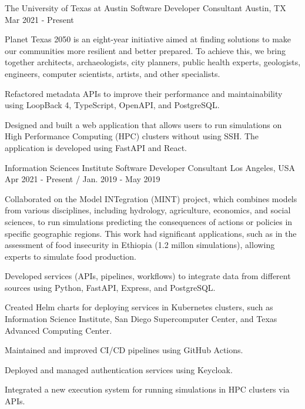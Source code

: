 \begin{cventries}

  \cventry
    {The University of Texas at Austin}
    {Software Developer Consultant}
    {Austin, TX}
    {Mar 2021 - Present}
    {
      \begin{cvitems}
        \item{Planet Texas 2050 is an eight-year initiative aimed at finding solutions to make our communities more resilient and better prepared. To achieve this, we bring together architects, archaeologists, city planners, public health experts, geologists, engineers, computer scientists, artists, and other specialists.}
        \item{Refactored metadata APIs to improve their performance and maintainability using LoopBack 4, TypeScript, OpenAPI, and PostgreSQL.}
        \item{Designed and built a web application that allows users to run simulations on High Performance Computing (HPC) clusters without using SSH. The application is developed using FastAPI and React.}
      \end{cvitems}
    }

  \cventry
    {Information Sciences Institute}
    {Software Developer Consultant}
    {Los Angeles, USA}
    {Apr 2021 - Present / Jan. 2019 - May 2019}
    {
      \begin{cvitems}
        \item{Collaborated on the Model INTegration (MINT) project, which combines models from various disciplines, including hydrology, agriculture, economics, and social sciences, to run simulations predicting the consequences of actions or policies in specific geographic regions. This work had significant applications, such as in the assessment of food insecurity in Ethiopia (1.2 millon simulations), allowing experts to simulate food production.}
        \item{Developed services (APIs, pipelines, workflows) to integrate data from different sources using Python, FastAPI, Express, and PostgreSQL.}
        \item{Created Helm charts for deploying services in Kubernetes clusters, such as Information Science Institute, San Diego Supercomputer Center, and Texas Advanced Computing Center.}
        \item{Maintained and improved CI/CD pipelines using GitHub Actions.}
        \item{Deployed and managed authentication services using Keycloak.}
        \item{Integrated a new execution system for running simulations in HPC clusters via APIs.}
      \end{cvitems}
    }


\end{cventries}

